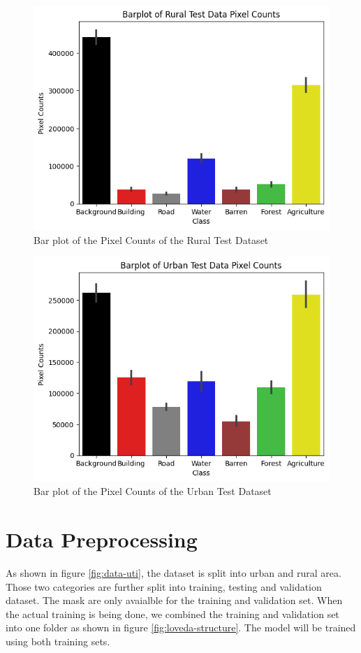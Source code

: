 \begin{figure}[!h]
\includegraphics[width=15.0cm, height=8.5cm]{images/rural test barplot.png}
\centering
\caption{Bar plot of the Pixel Counts of the Rural Test Dataset}
\label{fig:barplot-rural-test}
\end{figure}

\begin{figure}[!h]
\includegraphics[width=15.0cm, height=8.5cm]{images/urban test barplot.png}
\centering
\caption{Bar plot of the Pixel Counts of the Urban Test Dataset}
\label{fig:barplot-urban-test}
\end{figure}

\FloatBarrier


\section{Data Preprocessing}

As shown in figure \ref{fig:data-uti}, the dataset is split into urban and rural area. Those two categories are further split into training, testing and validation dataset. The mask are only avaialble for the training and validation set. When the actual training is being done, we combined the training and validation set into one folder as shown in figure \ref{fig:loveda-structure}. The model will be trained using both training sets.

